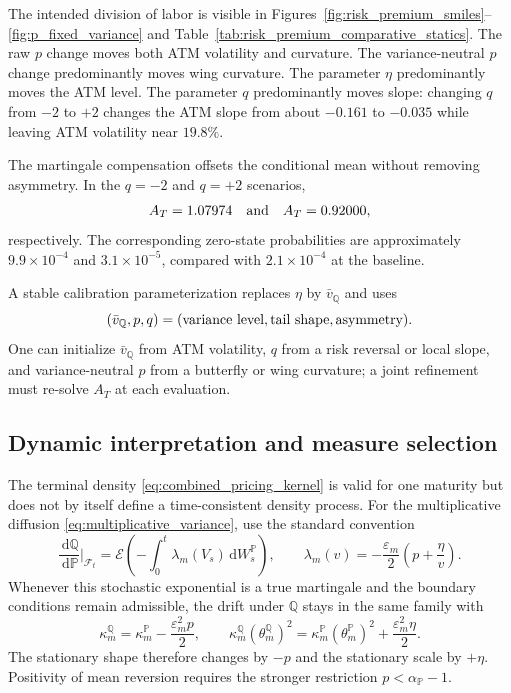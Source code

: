 \documentclass[11pt,a4paper]{article}
\newcommand{\dd}{\,\mathrm{d}}
\begin{document}
The intended division of labor is visible in
Figures~\ref{fig:risk_premium_smiles}--\ref{fig:p_fixed_variance} and
Table~\ref{tab:risk_premium_comparative_statics}.  The raw $p$ change moves
both ATM volatility and curvature.  The variance-neutral $p$ change
predominantly moves wing curvature.  The parameter $\eta$ predominantly
moves the ATM level.  The parameter $q$ predominantly moves slope:
changing $q$ from $-2$ to $+2$ changes the ATM slope from about $-0.161$ to
$-0.035$ while leaving ATM volatility near $19.8\%$.

The martingale compensation offsets the conditional mean without removing
asymmetry.  In the $q=-2$ and $q=+2$ scenarios,
\begin{equation}
  A_T=1.07974\quad\hbox{and}\quad A_T=0.92000,
\end{equation}
respectively.  The corresponding zero-state probabilities are approximately
$9.9\times10^{-4}$ and $3.1\times10^{-5}$, compared with
$2.1\times10^{-4}$ at the baseline.

A stable calibration parameterization replaces $\eta$ by
$\bar v_{\mathbb Q}$ and uses
\begin{equation}
  (\bar v_{\mathbb Q},p,q)
  =
  (\hbox{variance level},\hbox{tail shape},\hbox{asymmetry}).
\end{equation}
One can initialize $\bar v_{\mathbb Q}$ from ATM volatility, $q$ from a
risk reversal or local slope, and variance-neutral $p$ from a butterfly or
wing curvature; a joint refinement must re-solve $A_T$ at each evaluation.

\subsection{Dynamic interpretation and measure selection}

The terminal density \eqref{eq:combined_pricing_kernel} is valid for one
maturity but does not by itself define a time-consistent density process.
For the multiplicative diffusion \eqref{eq:multiplicative_variance}, use the
standard convention
\begin{equation}
  \frac{\dd\mathbb Q}{\dd\mathbb P}\bigg|_{\mathcal F_t}
  =
  \mathcal E\left(-\int_0^t\lambda_m(V_s)\dd W_s^{\mathbb P}\right),
  \qquad
  \lambda_m(v)
  =-\frac{\varepsilon_m}{2}
    \left(p+\frac{\eta}{v}\right).
  \label{eq:multiplicative_girsanov_kernel}
\end{equation}
Whenever this stochastic exponential is a true martingale and the boundary
conditions remain admissible, the drift under $\mathbb Q$ stays in the same
family with
\begin{equation}
  \kappa_m^{\mathbb Q}
  =\kappa_m^{\mathbb P}-\frac{\varepsilon_m^2p}{2},
  \qquad
  \kappa_m^{\mathbb Q}(\theta_m^{\mathbb Q})^2
  =
  \kappa_m^{\mathbb P}(\theta_m^{\mathbb P})^2
  +\frac{\varepsilon_m^2\eta}{2}.
  \label{eq:multiplicative_q_mapping}
\end{equation}
The stationary shape therefore changes by $-p$ and the stationary scale by
$+\eta$.  Positivity of mean reversion requires the stronger restriction
$p<\alpha_{\mathbb P}-1$.
\end{document}
